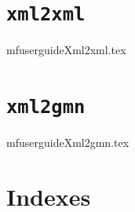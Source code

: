 \documentclass[11pt,a4paper]{report}
\begin{document}
\part{{\tt xml2xml}}

{mfuserguideXml2xml.tex}


\part{{\tt xml2gmn}}

{mfuserguideXml2gmn.tex}



\part{Indexes}

\useListsPagesHeadersAndFooters

\printindex[Files]

\printindex[Options]

\printindex[MusicXML]

\printindex[Main]


\end{document}
